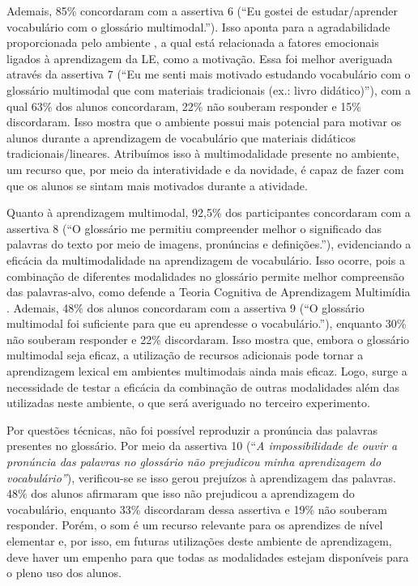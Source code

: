 Ademais, 85\% concordaram com a assertiva 6 (``Eu gostei de
estudar/aprender vocabulário com o glossário multimodal.''). Isso aponta
para a agradabilidade proporcionada pelo ambiente \cite{schumann1999neurobiology}, a
qual está relacionada a fatores emocionais ligados à aprendizagem da LE,
como a motivação. Essa foi melhor averiguada através da assertiva 7
(``Eu me senti mais motivado estudando vocabulário com o glossário
multimodal que com materiais tradicionais (ex.: livro didático)''), com
a qual 63\% dos alunos concordaram, 22\% não souberam responder e 15\%
discordaram. Isso mostra que o ambiente possui mais potencial para
motivar os alunos durante a aprendizagem de vocabulário que materiais
didáticos tradicionais/lineares. Atribuímos isso à multimodalidade
presente no ambiente, um recurso que, por meio da interatividade e da
novidade, é capaz de fazer com que os alunos se sintam mais motivados
durante a atividade.

Quanto à aprendizagem multimodal, 92,5\% dos participantes concordaram
com a assertiva 8 (``O glossário me permitiu compreender melhor o
significado das palavras do texto por meio de imagens, pronúncias e
definições.''), evidenciando a eficácia da multimodalidade na
aprendizagem de vocabulário. Isso ocorre, pois a combinação de
diferentes modalidades no glossário permite melhor compreensão das
palavras-alvo, como defende a Teoria Cognitiva de Aprendizagem
Multimídia \cite{mayer2001}. Ademais, 48\% dos alunos concordaram com a
assertiva 9 (``O glossário multimodal foi suficiente para que eu
aprendesse o vocabulário.''), enquanto 30\% não souberam responder e
22\% discordaram. Isso mostra que, embora o glossário multimodal seja
eficaz, a utilização de recursos adicionais pode tornar a aprendizagem
lexical em ambientes multimodais ainda mais eficaz. Logo, surge a
necessidade de testar a eficácia da combinação de outras modalidades
além das utilizadas neste ambiente, o que será averiguado no terceiro
experimento.

Por questões técnicas, não foi possível reproduzir a pronúncia das
palavras presentes no glossário. Por meio da assertiva 10 (``\emph{A
impossibilidade de ouvir a pronúncia das palavras no glossário não
prejudicou minha aprendizagem do vocabulário''}), verificou-se se isso
gerou prejuízos à aprendizagem das palavras. 48\% dos alunos afirmaram
que isso não prejudicou a aprendizagem do vocabulário, enquanto 33\%
discordaram dessa assertiva e 19\% não souberam responder. Porém, o som
é um recurso relevante para os aprendizes de nível elementar e, por
isso, em futuras utilizações deste ambiente de aprendizagem, deve haver
um empenho para que todas as modalidades estejam disponíveis para o
pleno uso dos alunos.

